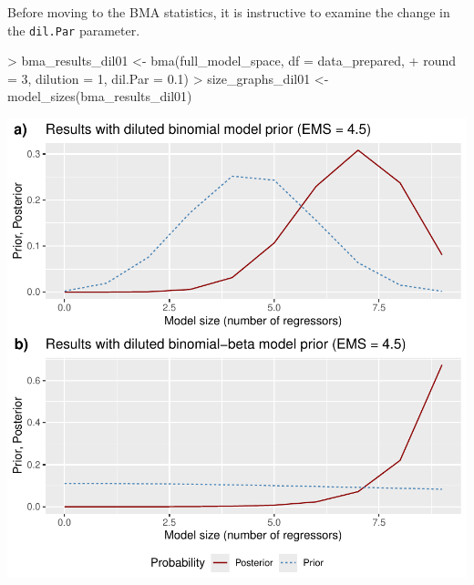 \documentclass[a4paper]{article}
\begin{document}
Before moving to the BMA statistics, it is instructive to examine the change in the \verb+dil.Par+ parameter.
\begin{Schunk}
\begin{Sinput}
> bma_results_dil01 <- bma(full_model_space, df = data_prepared,
+                        round = 3, dilution = 1, dil.Par = 0.1)
> size_graphs_dil01 <- model_sizes(bma_results_dil01)
\end{Sinput}
\end{Schunk}
\includegraphics{bdsm_vignette-041}
\end{document}
